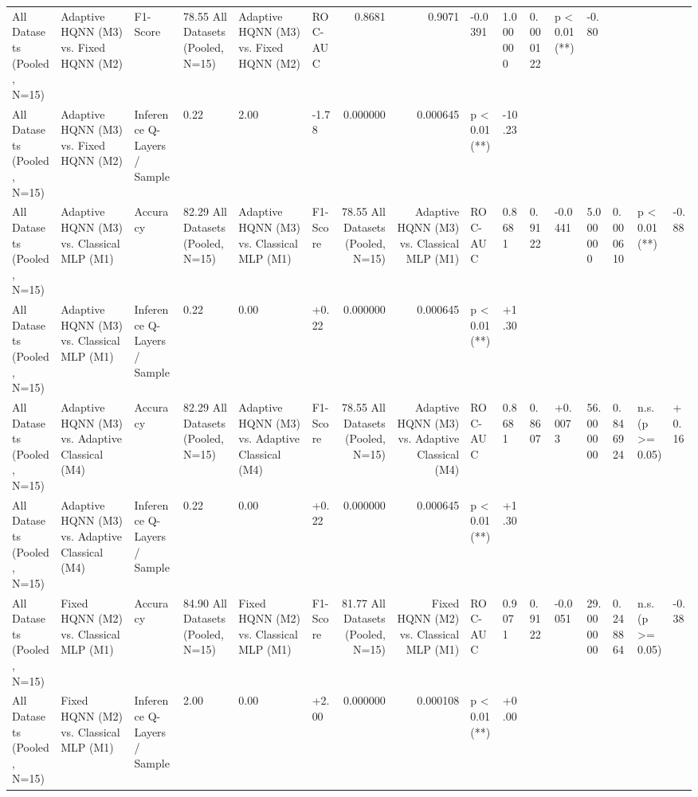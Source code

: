 \begin{table}
\begin{tabular}{llllllrrll}
All Datasets (Pooled, N=15) & Adaptive HQNN (M3) vs. Fixed HQNN (M2) & F1-Score & 78.55%
All Datasets (Pooled, N=15) & Adaptive HQNN (M3) vs. Fixed HQNN (M2) & ROC-AUC & 0.8681 & 0.9071 & -0.0391 & 1.000000 & 0.000122 & p < 0.01 (**) & -0.80 \\
All Datasets (Pooled, N=15) & Adaptive HQNN (M3) vs. Fixed HQNN (M2) & Inference Q-Layers / Sample & 0.22 & 2.00 & -1.78 & 0.000000 & 0.000645 & p < 0.01 (**) & -10.23 \\
All Datasets (Pooled, N=15) & Adaptive HQNN (M3) vs. Classical MLP (M1) & Accuracy & 82.29%
All Datasets (Pooled, N=15) & Adaptive HQNN (M3) vs. Classical MLP (M1) & F1-Score & 78.55%
All Datasets (Pooled, N=15) & Adaptive HQNN (M3) vs. Classical MLP (M1) & ROC-AUC & 0.8681 & 0.9122 & -0.0441 & 5.000000 & 0.000610 & p < 0.01 (**) & -0.88 \\
All Datasets (Pooled, N=15) & Adaptive HQNN (M3) vs. Classical MLP (M1) & Inference Q-Layers / Sample & 0.22 & 0.00 & +0.22 & 0.000000 & 0.000645 & p < 0.01 (**) & +1.30 \\
All Datasets (Pooled, N=15) & Adaptive HQNN (M3) vs. Adaptive Classical (M4) & Accuracy & 82.29%
All Datasets (Pooled, N=15) & Adaptive HQNN (M3) vs. Adaptive Classical (M4) & F1-Score & 78.55%
All Datasets (Pooled, N=15) & Adaptive HQNN (M3) vs. Adaptive Classical (M4) & ROC-AUC & 0.8681 & 0.8607 & +0.0073 & 56.000000 & 0.846924 & n.s. (p >= 0.05) & +0.16 \\
All Datasets (Pooled, N=15) & Adaptive HQNN (M3) vs. Adaptive Classical (M4) & Inference Q-Layers / Sample & 0.22 & 0.00 & +0.22 & 0.000000 & 0.000645 & p < 0.01 (**) & +1.30 \\
All Datasets (Pooled, N=15) & Fixed HQNN (M2) vs. Classical MLP (M1) & Accuracy & 84.90%
All Datasets (Pooled, N=15) & Fixed HQNN (M2) vs. Classical MLP (M1) & F1-Score & 81.77%
All Datasets (Pooled, N=15) & Fixed HQNN (M2) vs. Classical MLP (M1) & ROC-AUC & 0.9071 & 0.9122 & -0.0051 & 29.000000 & 0.248864 & n.s. (p >= 0.05) & -0.38 \\
All Datasets (Pooled, N=15) & Fixed HQNN (M2) vs. Classical MLP (M1) & Inference Q-Layers / Sample & 2.00 & 0.00 & +2.00 & 0.000000 & 0.000108 & p < 0.01 (**) & +0.00 \\
\bottomrule
\end{tabular}
\end{table}
